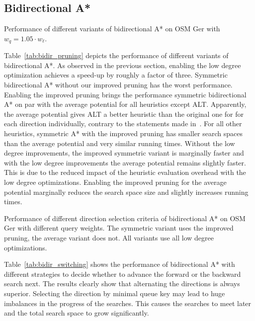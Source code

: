 \documentclass[manuscript,review]{acmart}
\begin{document}
\subsection{Bidirectional A*}

\begin{table}
\centering
\caption{Performance of different variants of bidirectional A* on OSM Ger with $w_q = 1.05 \cdot w_\ell$.}\label{tab:bidir_pruning}

\end{table}

Table~\ref{tab:bidir_pruning} depicts the performance of different variants of bidirectional A*.
As observed in the previous section, enabling the low degree optimization achieves a speed-up by roughly a factor of three.
Symmetric bidirectional A* without our improved pruning has the worst performance.
Enabling the improved pruning brings the performance symmetric bidirectional A* on par with the average potential for all heuristics except ALT.
Apparently, the average potential gives ALT a better heuristic than the original one for for each direction individually, contrary to the statements made in~\cite{gh-cspas-05}.
For all other heuristics, symmetric A* with the improved pruning has smaller search spaces than the average potential and very similar running times.
Without the low degree improvements, the improved symmetric variant is marginally faster and with the low degree improvements the average potential remains slightly faster.
This is due to the reduced impact of the heuristic evaluation overhead with the low degree optimizations.
Enabling the improved pruning for the average potential marginally reduces the search space size and slightly increases running times.

\begin{table}
\centering
\caption{
Performance of different direction selection criteria of bidirectional A* on OSM Ger with different query weights.
The symmetric variant uses the improved pruning, the average variant does not.
All variants use all low degree optimizations.
}\label{tab:bidir_switching}

\end{table}

Table~\ref{tab:bidir_switching} shows the performance of bidirectional A* with different strategies to decide whether to advance the forward or the backward search next.
The results clearly show that alternating the directions is always superior.
Selecting the direction by minimal queue key may lead to huge imbalances in the progress of the searches.
This causes the searches to meet later and the total search space to grow significantly.
\end{document}
